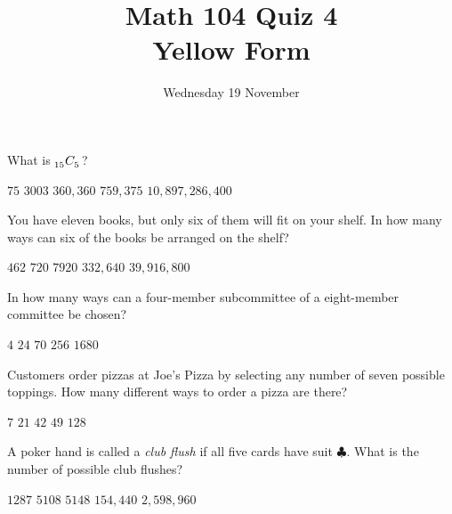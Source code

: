 \documentclass[answers,12pt]{exam}
\title{Math 104 Quiz 4\\Yellow Form}
\date{Wednesday 19 November}
\newcommand\ncr[2]{\tensor[_{#1}]C{_{#2}}}
\begin{document}
\maketitle
\begin{center}
\end{center}

\begin{questions}

\question What is $\ncr{15}{5}$?\\
\begin{oneparchoices}
\choice $75$ %
\correctchoice $3003$
\choice $360,360$ %
\choice $759,375$ %
\choice $10,897,286,400$ %
\end{oneparchoices}

\question You have eleven books, but only six
of them will fit on your shelf. In how many 
ways can six of the books be arranged on the shelf?\\
\begin{oneparchoices}
\choice $462$ %
\choice $720$ %
\choice $7920$ %
\correctchoice $332,640$
\choice $39,916,800$ %
\end{oneparchoices}

\question In how many ways can a four-member subcommittee
of a eight-member committee be chosen?\\
\begin{oneparchoices}
\choice $4$ %
\choice $24$ %
\correctchoice $70$
\choice $256$ %
\choice $1680$ %
\end{oneparchoices}

\question Customers order pizzas at Joe's Pizza
by selecting any number of seven possible toppings.
How many different ways to order a pizza are there?\\
\begin{oneparchoices}
\choice $7$ %
\choice $21$ %
\choice $42$ %
\choice $49$ %
\correctchoice $128$
\end{oneparchoices}

\question A poker hand is called a {\em club flush}
if all five cards have suit $\clubsuit$. What is
the number of possible club flushes?\\
\begin{oneparchoices}
\correctchoice $1287$
\choice $5108$ %
\choice $5148$ %
\choice $154,440$ %
\choice $2,598,960$ %
\end{oneparchoices}


\end{questions}
\end{document}
